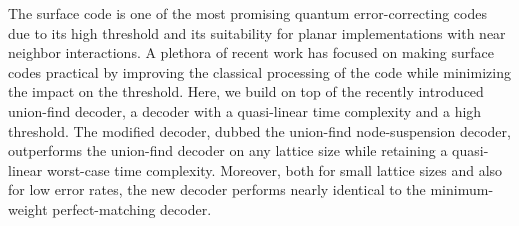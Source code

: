The surface code is one of the most promising quantum error-correcting codes due to its high threshold and its suitability for planar implementations with near neighbor interactions. A plethora of recent work has focused on making surface codes practical by improving the classical processing of the code while minimizing the impact on the threshold. Here, we build on top of the recently introduced union-find decoder, a decoder with a quasi-linear time complexity and a high threshold. The modified decoder, dubbed the union-find node-suspension decoder, outperforms the union-find decoder on any lattice size while retaining a quasi-linear worst-case time complexity. Moreover, both for small lattice sizes and also for low error rates, the new decoder performs nearly identical to the minimum-weight perfect-matching decoder.

